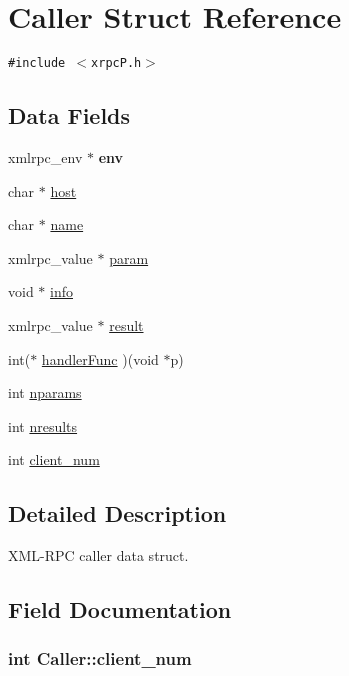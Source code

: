 \hypertarget{structCaller}{
\section{Caller Struct Reference}
\label{structCaller}
}
{\tt \#include $<$xrpcP.h$>$}

\subsection*{Data Fields}
\begin{CompactItemize}
\item 
\hypertarget{structCaller_dee1c4d72e439caeec6fdea9b20c711b}{
xmlrpc\_\-env $\ast$ \textbf{env}}
\label{structCaller_dee1c4d72e439caeec6fdea9b20c711b}

\item 
char $\ast$ \hyperlink{structCaller_67413ee10f064354a789c92374d1f823}{host}
\item 
char $\ast$ \hyperlink{structCaller_6b7a50fb0cf0da41c01662088de4d79e}{name}
\item 
xmlrpc\_\-value $\ast$ \hyperlink{structCaller_29d5894771b1992590480d27ceb401e5}{param}
\item 
void $\ast$ \hyperlink{structCaller_a99bc0344a1f25e580ead02f48675c58}{info}
\item 
xmlrpc\_\-value $\ast$ \hyperlink{structCaller_96d6cfd2ecc822be1f59b80216def471}{result}
\item 
int($\ast$ \hyperlink{structCaller_05f32e75bb7528cc2f545e106efa8803}{handlerFunc} )(void $\ast$p)
\item 
int \hyperlink{structCaller_1dbd14c65b8f3e0046ec1dc73f6f69f9}{nparams}
\item 
int \hyperlink{structCaller_d8f29c03ab60a299089385d5e82aa8c6}{nresults}
\item 
int \hyperlink{structCaller_14f07b2f5e12f87b72dbeb56998155c6}{client\_\-num}
\end{CompactItemize}


\subsection{Detailed Description}
XML-RPC caller data struct. 

\subsection{Field Documentation}
\hypertarget{structCaller_14f07b2f5e12f87b72dbeb56998155c6}{
\subsubsection[{client\_\-num}]{\setlength{\rightskip}{0pt plus 5cm}int {\bf Caller::client\_\-num}}}
\label{structCaller_14f07b2f5e12f87b72dbeb56998155c6}


